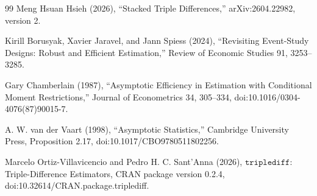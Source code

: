 \documentclass{article}
\begin{document}
\begin{thebibliography}{99}
   Meng Hsuan Hsieh (2026), ``Stacked Triple Differences,'' arXiv:2604.22982, version 2.

   Kirill Borusyak, Xavier Jaravel, and Jann Spiess (2024), ``Revisiting Event-Study Designs: Robust and Efficient Estimation,'' Review of Economic Studies 91, 3253--3285.

   Gary Chamberlain (1987), ``Asymptotic Efficiency in Estimation with Conditional Moment Restrictions,'' Journal of Econometrics 34, 305--334, doi:10.1016/0304-4076(87)90015-7.

   A. W. van der Vaart (1998), ``Asymptotic Statistics,'' Cambridge University Press, Proposition 2.17, doi:10.1017/CBO9780511802256.

   Marcelo Ortiz-Villavicencio and Pedro H. C. Sant'Anna (2026), \(\texttt{triplediff}\): Triple-Difference Estimators, CRAN package version 0.2.4, doi:10.32614/CRAN.package.triplediff.

\end{thebibliography}
\end{document}
